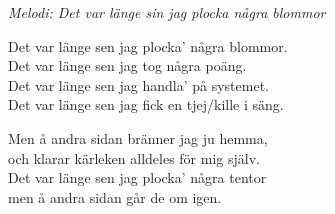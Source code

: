 {\footnotesize\textit{Melodi: Det var länge sin jag plocka några blommor}}\par
\vspace{10pt}
Det var länge sen jag plocka' några blommor.\\
Det var länge sen jag tog några poäng.\\
Det var länge sen jag handla' på systemet.\\
Det var länge sen jag fick en tjej/kille i säng.\par
\vspace{10pt}
Men å andra sidan bränner jag ju hemma,\\
och klarar kärleken alldeles för mig själv.\\
Det var länge sen jag plocka' några tentor\\
men å andra sidan går de om igen.
